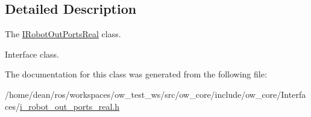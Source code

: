\subsection{Detailed Description}
The \hyperlink{classow__core_1_1IRobotOutPortsReal}{I\+Robot\+Out\+Ports\+Real} class. 

Interface class. 

The documentation for this class was generated from the following file\+:\begin{DoxyCompactItemize}
\item 
/home/dean/ros/workspaces/ow\+\_\+test\+\_\+ws/src/ow\+\_\+core/include/ow\+\_\+core/\+Interfaces/\hyperlink{i__robot__out__ports__real_8h}{i\+\_\+robot\+\_\+out\+\_\+ports\+\_\+real.\+h}\end{DoxyCompactItemize}
